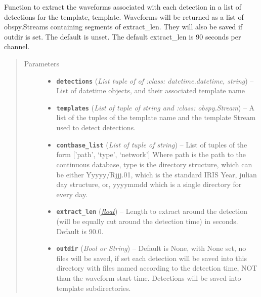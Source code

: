 \documentclass[a4paper,10pt,english]{sphinxmanual}
\begin{document}
\begin{fulllineitems}
\label{submodules/utils.clustering:clustering.extract_detections}
Function to extract the waveforms associated with each detection in a list
of detections for the template, template.  Waveforms will be returned as
a list of obspy.Streams containing segments of extract\_len.  They will also
be saved if outdir is set.  The default is unset.  The default extract\_len
is 90 seconds per channel.
\begin{quote}\begin{description}
\item[{Parameters}] \leavevmode\begin{itemize}
\item {} 
\textbf{\texttt{detections}} (\emph{List tuple of of :class: datetime.datetime, string}) -- List of datetime objects, and their associated template            name

\item {} 
\textbf{\texttt{templates}} (\emph{List of tuple of string and :class: obspy.Stream}) -- A list of the tuples of the template name and the template            Stream used to detect detections.

\item {} 
\textbf{\texttt{contbase\_list}} (\emph{List of tuple of string}) -- List of tuples of the form {[}'path', `type', `network'{]}                    Where path is the path to the continuous database, type is                    the directory structure, which can be either Yyyyy/Rjjj.01,                    which is the standard IRIS Year, julian day structure, or,                    yyyymmdd which is a single directory for every day.

\item {} 
\textbf{\texttt{extract\_len}} (\href{https://docs.python.org/library/functions.html\#float}{\emph{float}}) -- Length to extract around the detection (will be equally            cut around the detection time) in seconds.  Default is 90.0.

\item {} 
\textbf{\texttt{outdir}} (\emph{Bool or String}) -- Default is None, with None set, no files will be saved,            if set each detection will be saved into this directory with files            named according to the detection time, NOT than the waveform            start time. Detections will be saved into template subdirectories.


\end{itemize}
\end{description}
\end{quote}
\end{fulllineitems}
\end{document}
